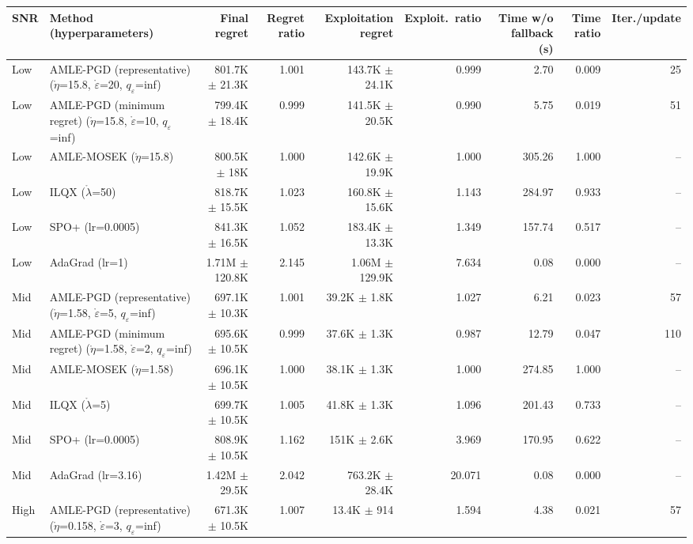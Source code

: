 \begin{tabular}{llrrrrrrr}
\toprule
SNR & Method (hyperparameters) & Final regret & Regret ratio & Exploitation regret & Exploit.\ ratio & Time w/o fallback (s) & Time ratio & Iter./update \\
\midrule
Low & AMLE-PGD (representative) ($\mathring{\eta}$=15.8, $\mathring{\varepsilon}$=20, $q_\varepsilon$=inf) & 801.7K $\pm$ 21.3K & 1.001 & 143.7K $\pm$ 24.1K & 0.999 & 2.70 & 0.009 & 25 \\
Low & AMLE-PGD (minimum regret) ($\mathring{\eta}$=15.8, $\mathring{\varepsilon}$=10, $q_\varepsilon$=inf) & 799.4K $\pm$ 18.4K & 0.999 & 141.5K $\pm$ 20.5K & 0.990 & 5.75 & 0.019 & 51 \\
Low & AMLE-MOSEK ($\mathring{\eta}$=15.8) & 800.5K $\pm$ 18K & 1.000 & 142.6K $\pm$ 19.9K & 1.000 & 305.26 & 1.000 & -- \\
Low & ILQX ($\mathring{\lambda}$=50) & 818.7K $\pm$ 15.5K & 1.023 & 160.8K $\pm$ 15.6K & 1.143 & 284.97 & 0.933 & -- \\
Low & SPO+ (lr=0.0005) & 841.3K $\pm$ 16.5K & 1.052 & 183.4K $\pm$ 13.3K & 1.349 & 157.74 & 0.517 & -- \\
Low & AdaGrad (lr=1) & 1.71M $\pm$ 120.8K & 2.145 & 1.06M $\pm$ 129.9K & 7.634 & 0.08 & 0.000 & -- \\
\midrule
Mid & AMLE-PGD (representative) ($\mathring{\eta}$=1.58, $\mathring{\varepsilon}$=5, $q_\varepsilon$=inf) & 697.1K $\pm$ 10.3K & 1.001 & 39.2K $\pm$ 1.8K & 1.027 & 6.21 & 0.023 & 57 \\
Mid & AMLE-PGD (minimum regret) ($\mathring{\eta}$=1.58, $\mathring{\varepsilon}$=2, $q_\varepsilon$=inf) & 695.6K $\pm$ 10.5K & 0.999 & 37.6K $\pm$ 1.3K & 0.987 & 12.79 & 0.047 & 110 \\
Mid & AMLE-MOSEK ($\mathring{\eta}$=1.58) & 696.1K $\pm$ 10.5K & 1.000 & 38.1K $\pm$ 1.3K & 1.000 & 274.85 & 1.000 & -- \\
Mid & ILQX ($\mathring{\lambda}$=5) & 699.7K $\pm$ 10.5K & 1.005 & 41.8K $\pm$ 1.3K & 1.096 & 201.43 & 0.733 & -- \\
Mid & SPO+ (lr=0.0005) & 808.9K $\pm$ 10.5K & 1.162 & 151K $\pm$ 2.6K & 3.969 & 170.95 & 0.622 & -- \\
Mid & AdaGrad (lr=3.16) & 1.42M $\pm$ 29.5K & 2.042 & 763.2K $\pm$ 28.4K & 20.071 & 0.08 & 0.000 & -- \\
\midrule
High & AMLE-PGD (representative) ($\mathring{\eta}$=0.158, $\mathring{\varepsilon}$=3, $q_\varepsilon$=inf) & 671.3K $\pm$ 10.5K & 1.007 & 13.4K $\pm$ 914 & 1.594 & 4.38 & 0.021 & 57 \\

\end{tabular}
